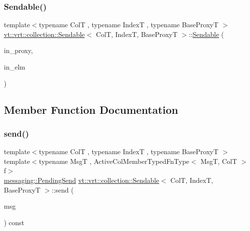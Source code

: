 \mbox{\label{structvt_1_1vrt_1_1collection_1_1_sendable_aa4b3473480b076117715d1d21b53919b}} 
\subsubsection{\texorpdfstring{Sendable()}{Sendable()}\hspace{0.1cm}{\footnotesize\ttfamily [2/2]}}
{\footnotesize\ttfamily template$<$typename ColT , typename IndexT , typename Base\+ProxyT $>$ \\
\hyperlink{structvt_1_1vrt_1_1collection_1_1_sendable}{vt\+::vrt\+::collection\+::\+Sendable}$<$ ColT, IndexT, Base\+ProxyT $>$\+::\hyperlink{structvt_1_1vrt_1_1collection_1_1_sendable}{Sendable} (\begin{DoxyParamCaption}\item[{typename Base\+Proxy\+T\+::\+Proxy\+Type const \&}]{in\+\_\+proxy,  }\item[{typename Base\+Proxy\+T\+::\+Element\+Proxy\+Type const \&}]{in\+\_\+elm }\end{DoxyParamCaption})}



\subsection{Member Function Documentation}
\mbox{\label{structvt_1_1vrt_1_1collection_1_1_sendable_a321d85ceafaf6525875fb7468a80ac6d}} 
\subsubsection{\texorpdfstring{send()}{send()}\hspace{0.1cm}{\footnotesize\ttfamily [1/7]}}
{\footnotesize\ttfamily template$<$typename ColT , typename IndexT , typename Base\+ProxyT $>$ \\
template$<$typename MsgT , Active\+Col\+Member\+Typed\+Fn\+Type$<$ Msg\+T, Col\+T $>$ f$>$ \\
\hyperlink{structvt_1_1messaging_1_1_pending_send}{messaging\+::\+Pending\+Send} \hyperlink{structvt_1_1vrt_1_1collection_1_1_sendable}{vt\+::vrt\+::collection\+::\+Sendable}$<$ ColT, IndexT, Base\+ProxyT $>$\+::send (\begin{DoxyParamCaption}\item[{MsgT $\ast$}]{msg }\end{DoxyParamCaption}) const}

